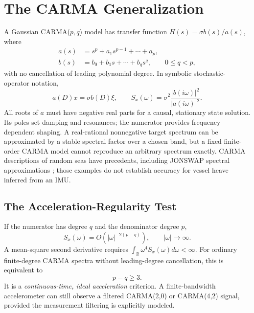 \documentclass[10pt,journal]{IEEEtran}
\newcommand{\R}{\mathbb R}
\newcommand{\PSD}{S_x}
\begin{document}
\section{The CARMA Generalization}
A Gaussian CARMA(\(p,q\)) model \cite{brockwell01,brockwell04} has
transfer function \(H(s)=\sigma b(s)/a(s)\), where
\begin{align}
a(s)&=s^p+a_1s^{p-1}+\cdots+a_p,\nonumber\\
b(s)&=b_0+b_1s+\cdots+b_qs^q,\qquad 0\le q<p,
\label{eq:carma-poly}
\end{align}
with no cancellation of leading polynomial degree. In symbolic
stochastic-operator notation,
\begin{equation}
a(D)x=\sigma b(D)\xi,\qquad
\PSD(\omega)=\sigma^2\frac{|b(i\omega)|^2}{|a(i\omega)|^2}.
\label{eq:carma-psd}
\end{equation}
All roots of \(a\) must have negative real parts for a causal,
stationary state solution. Its poles set damping and resonances;
the numerator provides frequency-dependent shaping. A real-rational
nonnegative target spectrum can be approximated by a stable
spectral factor over a chosen band, but a fixed finite-order
CARMA model cannot reproduce an arbitrary spectrum exactly.
CARMA descriptions of random seas have precedents, including
JONSWAP spectral approximations \cite{dostal11}; those
examples do not establish accuracy for vessel heave inferred
from an IMU.

\subsection{The Acceleration-Regularity Test}
If the numerator has degree \(q\) and the denominator degree \(p\),
\begin{equation}
\PSD(\omega)=O(|\omega|^{-2(p-q)}),
\qquad |\omega|\rightarrow\infty.
\label{eq:tail}
\end{equation}
A mean-square second derivative requires
\(\int_{\R}\omega^4\PSD(\omega)d\omega<\infty\).
For ordinary finite-degree CARMA spectra without leading-degree
cancellation, this is equivalent to
\begin{equation}
\boxed{p-q\ge 3.}
\label{eq:acc-criterion}
\end{equation}
It is a \emph{continuous-time, ideal acceleration} criterion.
A finite-bandwidth accelerometer can still observe a filtered
CARMA(2,0) or CARMA(4,2) signal, provided the measurement filtering
is explicitly modeled.
\end{document}
